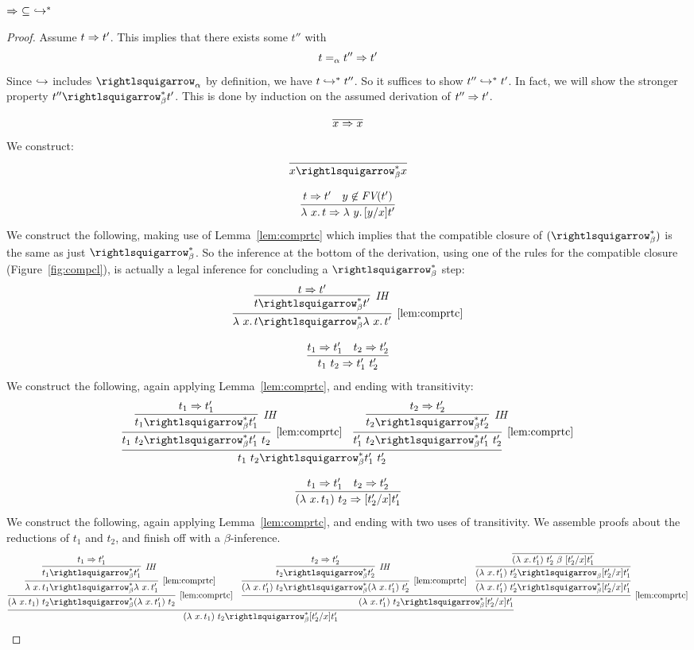 \begin{lemma}
  \label{lem:predmbeta}
  $\Rightarrow\ \subseteq\ \hookrightarrow^*$
\end{lemma}
\begin{proof}
  Assume $t \Rightarrow t'$.  This implies that there exists some $t''$ with
  \[
  t =_\alpha t'' \Rightarrow t'
  \]
  \noindent Since $\hookrightarrow$ includes $\curva_\alpha$ by definition, we have
  $t \hookrightarrow^* t''$.  So it suffices to show $t'' \hookrightarrow^* t'$.  In fact,
  we will show the stronger property $t'' \curva_\beta^* t'$.  This
  is done by  induction on the assumed
  derivation of $t'' \Rightarrow t'$.

  \case{ }
  \[
  \predvar
  \]
  \noindent We construct:
  \[
  \infer{x \betaa_\beta^* x}{\ }
  \]

  \case{ }
  \[
  \predlam
  \]
  \noindent We construct the following, making use of
  Lemma~\ref{lem:comprtc} which implies that the compatible closure of $(\betaa_\beta^*)$
  is the same as just $\betaa_\beta^*$. So the inference at the bottom of the
  derivation, using one of the rules for the compatible closure
  (Figure~\ref{fig:compcl}), is actually a legal inference for
  concluding a $\betaa_\beta^*$ step:
  \[
  \infer[\ref{lem:comprtc}]{\lam{x}{t} \betaa_\beta^* \lam{x}{t'}}
    {\infer[\textit{IH}]{t \betaa_\beta^* t'}{t \Pred t'}}
    \]

    \case{ }
    \[
    \predapp
    \]
    \noindent We construct the following, again applying Lemma~\ref{lem:comprtc}, and ending with transitivity:
    \[
    \infer{t_1\ t_2 \betaa_\beta^* t_1'\ t_2'}
          {\infer[\ref{lem:comprtc}]{t_1\ t_2 \betaa_\beta^* t_1'\ t_2}{\infer[\textit{IH}]{t_1 \betaa_\beta^* t_1'}{t_1 \Pred t_1'}} &
           \infer[\ref{lem:comprtc}]{t_1'\ t_2 \betaa_\beta^* t_1'\ t_2'}{\infer[\textit{IH}]{t_2 \betaa_\beta^* t_2'}{t_2 \Pred t_2'}}}
          \]

    \case{ }
    \[
    \predbeta
    \]
    \noindent We construct the following, again applying Lemma~\ref{lem:comprtc}, and ending with two uses of transitivity.  We assemble proofs about the reductions of $t_1$ and $t_2$, and finish off with a $\beta$-inference.
    \[
    \infer{(\lam{x}{t_1})\ t_2 \betaa_\beta^* [t_2'/x]t_1'}
          {\infer[\ref{lem:comprtc}]{(\lam{x}{t_1})\ t_2 \betaa_\beta^* (\lam{x}{t_1'})\ t_2}
                {\infer[\ref{lem:comprtc}]{\lam{x}{t_1} \betaa_\beta^* \lam{x}{t_1'}}{\infer[\textit{IH}]{t_1 \betaa_\beta^* t_1'}{t_1 \Pred t_1'}}} &
                \infer[\ref{lem:comprtc}]{(\lam{x}{t_1'})\ t_2 \betaa_\beta^* [t_2'/x]t_1'}
                      {\infer[\ref{lem:comprtc}]{(\lam{x}{t_1'})\ t_2 \betaa_\beta^* (\lam{x}{t_1'})\ t_2'}
                        {\infer[\textit{IH}]{t_2 \betaa_\beta^* t_2'}{t_2 \Pred t_2'}}
                     & \infer{(\lam{x}{t_1'})\ t_2' \betaa_\beta^* [t_2'/x]t_1'}{\infer{(\lam{x}{t_1'})\ t_2' \betaa_\beta [t_2'/x]t_1'}{\infer{(\lam{x}{t_1'})\ t_2' \ \beta\  [t_2'/x]t_1'}{\ }}}}}
          \]

          
\end{proof}


